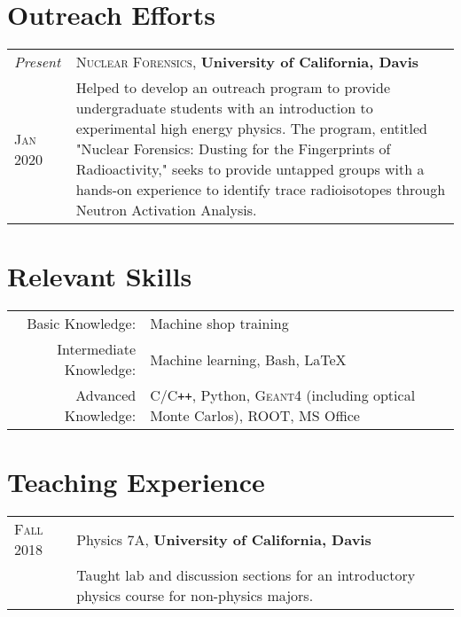 \documentclass[a4paper,10pt]{article}
\newcommand{\UCD}{\textbf{University of California, Davis\xspace}}
\begin{document}
\section{Outreach Efforts}
\begin{tabular}{R{1.5cm}|L{14cm}}
\emph{Present} & \textsc{Nuclear Forensics}, \UCD \\
\textsc{Jan 2020} & {\footnotesize Helped to develop an outreach program to provide undergraduate students with an introduction to experimental high energy physics. The program, entitled "Nuclear Forensics: Dusting for the Fingerprints of Radioactivity," seeks to provide untapped groups with a hands-on experience to identify trace radioisotopes through Neutron Activation Analysis.} \\

\end{tabular}

\section{Relevant Skills}
\begin{tabular}{rl}
Basic Knowledge: & 
	Machine shop training
	\\
	
Intermediate Knowledge: &   
	Machine learning,
	Bash,
	{\fb \LaTeX}\setmainfont[SmallCapsFont=Fontin-SmallCaps.otf]{Fontin.otf} 
	\\

Advanced Knowledge: & 
	C/C\texttt{++},
	Python,
	\textsc{Geant4} (including optical Monte Carlos),
	ROOT,
	MS Office
	\\
\end{tabular}


\section{Teaching Experience}
\begin{tabular}{R{1.5cm} | L{14cm}}
\textsc{Fall 2018} & Physics 7A, \UCD \\
& {\footnotesize Taught lab and discussion sections for an introductory physics course for non-physics majors.} \\
\end{tabular}
\end{document}
